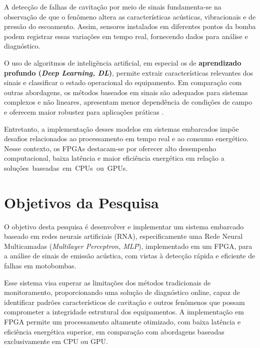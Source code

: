 
A detecção de falhas de cavitação por meio de sinais fundamenta-se na observação de que o fenômeno altera as características acústicas, vibracionais e de pressão do escoamento. Assim, sensores instalados em diferentes pontos da bomba podem registrar essas variações em tempo real, fornecendo dados para análise e diagnóstico.

O uso de algoritmos de inteligência artificial, em especial os de \textbf{aprendizado profundo (\textit{Deep Learning, DL})}, permite extrair características relevantes dos sinais e classificar o estado operacional do equipamento. Em comparação com outras abordagens, os métodos baseados em sinais são adequados para sistemas complexos e não lineares, apresentam menor dependência de condições de campo e oferecem maior robustez para aplicações práticas \cite{liu2023review}.

Entretanto, a implementação desses modelos em sistemas embarcados impõe desafios relacionados ao processamento em tempo real e ao consumo energético. Nesse contexto, os FPGAs destacam-se por oferecer alto desempenho computacional, baixa latência e maior eficiência energética em relação a \mbox{soluções baseadas em CPUs ou GPUs.}

\section{Objetivos da Pesquisa}

O objetivo desta pesquisa é desenvolver e implementar um sistema embarcado baseado em redes neurais artificiais (RNA), especificamente uma Rede Neural Multicamadas (\textit{Multilayer Perceptron, MLP}), implementado em um  FPGA, para a análise de sinais de emissão acústica, com vistas à detecção rápida e eficiente de falhas em motobombas.

Esse sistema visa superar as limitações dos métodos tradicionais de monitoramento, proporcionando uma solução de diagnóstico online, capaz de identificar padrões característicos de cavitação e outros fenômenos que possam comprometer a integridade estrutural dos equipamentos. A implementação em FPGA permite um processamento altamente otimizado, com baixa latência e eficiência energética superior, em comparação com abordagens baseadas exclusivamente em CPU ou GPU.

